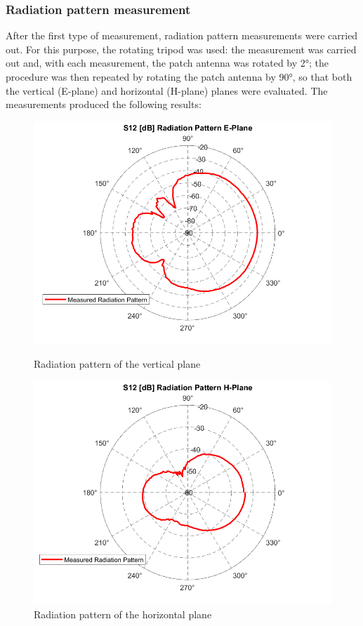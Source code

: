 \documentclass[]{article}
\begin{document}
\subsubsection{Radiation pattern measurement}
After the first type of measurement, radiation pattern measurements were carried out. For this purpose, the rotating tripod was used: the measurement was carried out and, with each measurement, the patch antenna was rotated by 2°; the procedure was then repeated by rotating the patch antenna by 90°, so that both the vertical (E-plane) and horizontal (H-plane) planes were evaluated.
The measurements produced the following results: 
\begin{figure}[H]
	\centering
	\begin{minipage}{0.41\linewidth}
		\centering
		\includegraphics[width=\linewidth]{img/S12_vs_angle_rad_pattern_no_comp_eplane_small}
		\caption{Radiation pattern of the vertical plane}
		\label{Epln-solo}
	\end{minipage}\hspace{0.1\linewidth}
	\begin{minipage}{0.42\linewidth}
		\centering
		\includegraphics[width=\linewidth]{img/S12_vs_angle_rad_pattern_no_comp_hplane_small}
		\caption{Radiation pattern of the horizontal plane}
		\label{Hpln-solo}
	\end{minipage}
\end{figure}
\end{document}
